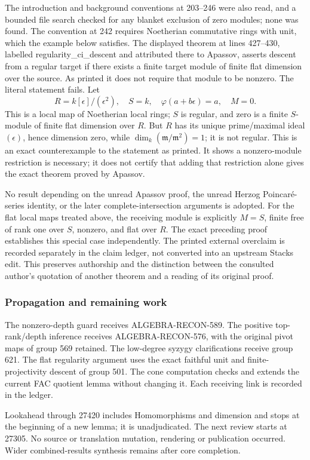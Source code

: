 The introduction and background conventions at 203--246 were also read, and a bounded file search checked for any blanket exclusion of zero modules; none was found. The convention at 242 requires Noetherian commutative rings with unit, which the example below satisfies. The displayed theorem at lines 427--430, labelled regularity\_ci\_descent and attributed there to Apassov, asserts descent from a regular target if there exists a finite target module of finite flat dimension over the source. As printed it does not require that module to be nonzero. The literal statement fails. Let \[
R=k[\epsilon]/(\epsilon^2),\quad S=k,\quad
\varphi(a+b\epsilon)=a,\quad M=0 .
\] This is a local map of Noetherian local rings; \(S\) is regular, and zero is a finite \(S\)-module of finite flat dimension over \(R\). But \(R\) has its unique prime/maximal ideal \((\epsilon)\), hence dimension zero, while \(\dim_k(\mathfrak m/\mathfrak m^2)=1\); it is not regular. This is an exact counterexample to the statement as printed. It shows a nonzero-module restriction is necessary; it does not certify that adding that restriction alone gives the exact theorem proved by Apassov.

No result depending on the unread Apassov proof, the unread Herzog Poincaré-series identity, or the later complete-intersection arguments is adopted. For the flat local maps treated above, the receiving module is explicitly \(M=S\), finite free of rank one over \(S\), nonzero, and flat over \(R\). The exact preceding proof establishes this special case independently. The printed external overclaim is recorded separately in the claim ledger, not converted into an upstream Stacks edit. This preserves authorship and the distinction between the consulted author's quotation of another theorem and a reading of its original proof.

\subsubsection{Propagation and remaining work}\label{algebra-proof-023-propagation-and-remaining-work}

The nonzero-depth guard receives ALGEBRA-RECON-589. The positive top-rank/depth inference receives ALGEBRA-RECON-576, with the original pivot maps of group 569 retained. The low-degree syzygy clarifications receive group 621. The flat regularity argument uses the exact faithful unit and finite-projectivity descent of group 501. The cone computation checks and extends the current FAC quotient lemma without changing it. Each receiving link is recorded in the ledger.

Lookahead through 27420 includes Homomorphisms and dimension and stops at the beginning of a new lemma; it is unadjudicated. The next review starts at 27305. No source or translation mutation, rendering or publication occurred. Wider combined-results synthesis remains after core completion.
